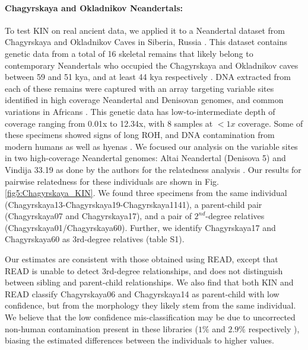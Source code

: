 \documentclass[12pt, letterpaper]{article}
\begin{document}
\paragraph{Chagyrskaya and Okladnikov Neandertals:}
To test KIN on real ancient data, we applied it to a Neandertal dataset from Chagyrskaya and Okladnikov Caves in Siberia, Russia \cite{kolobova_archaeological_2020-1, mafessoni_high-coverage_2020,laurits_skov_genetic_nodate}. This dataset contains genetic data from a total of 16 skeletal remains that likely belong to contemporary Neandertals who occupied the Chagyrskaya and Okladnikov caves between 59 and 51 kya, and at least 44 kya respectively \cite{laurits_skov_genetic_nodate}. DNA extracted from each of these remains were captured with an array targeting variable sites identified in high coverage Neandertal and Denisovan genomes, and common variations in Africans \cite{laurits_skov_genetic_nodate}. This genetic data has  low-to-intermediate depth of coverage ranging from 0.01x to 12.34x, with 8 samples at  $<1x$ coverage. Some of these specimens showed signs of long ROH, and DNA contamination from modern humans as well as hyenas \cite{laurits_skov_genetic_nodate}. We focused our analysis on the variable sites in two high-coverage Neandertal genomes: Altai Neandertal (Denisova 5) \cite{prufer_complete_2014} and Vindija 33.19 \cite{prufer_high-coverage_2017} as done by the authors for the relatedness analysis \cite{laurits_skov_genetic_nodate}. Our results for pairwise relatedness for these individuals are shown in Fig.\ref{fig5:Chagyrskaya_KIN}. We found three specimens from the same  individual (Chagyrskaya13-Chagyrskaya19-Chagyrskaya1141), a parent-child pair (Chagyrskaya07 and Chagyrskaya17), and a pair of  $2^{nd}$-degree relatives (Chagyrskaya01/Chagyrskaya60). Further, we identify Chagyrskaya17 and Chagyrskaya60 as 3rd-degree relatives (table S1). 

Our estimates are consistent with those obtained using READ, except that READ is unable to detect 3rd-degree relationships, and does not distinguish between sibling and parent-child relationships. We also find that both KIN and READ classify Chagyrskaya06 and Chagyrskaya14 as parent-child with low confidence, but from the morphology they likely stem from the same individual. We believe that the low confidence mis-classification may be due to uncorrected non-human contamination present in these libraries ($1\%$ and $2.9\%$ respectively \cite{laurits_skov_genetic_nodate}), biasing the estimated differences between the individuals to higher values.
\end{document}
